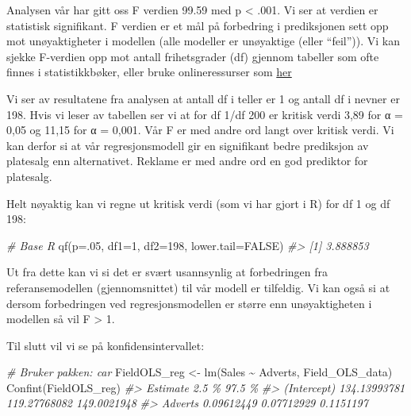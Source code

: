 \documentclass[
]{article}
\newenvironment{Shaded}{\begin{snugshade}}{\end{snugshade}}
\newcommand{\AttributeTok}[1]{\textcolor[rgb]{0.77,0.63,0.00}{#1}}
\newcommand{\CommentTok}[1]{\textcolor[rgb]{0.56,0.35,0.01}{\textit{#1}}}
\newcommand{\ConstantTok}[1]{\textcolor[rgb]{0.00,0.00,0.00}{#1}}
\newcommand{\DecValTok}[1]{\textcolor[rgb]{0.00,0.00,0.81}{#1}}
\newcommand{\FunctionTok}[1]{\textcolor[rgb]{0.00,0.00,0.00}{#1}}
\newcommand{\NormalTok}[1]{#1}
\newcommand{\OtherTok}[1]{\textcolor[rgb]{0.56,0.35,0.01}{#1}}
\newcommand{\SpecialCharTok}[1]{\textcolor[rgb]{0.00,0.00,0.00}{#1}}
\begin{document}
Analysen vår har gitt oss F verdien 99.59 med p \textless{} .001. Vi ser at verdien er statistisk signifikant. F verdien er et mål på forbedring i prediksjonen sett opp mot unøyaktigheter i modellen (alle modeller er unøyaktige (eller ``feil'')).
Vi kan sjekke F-verdien opp mot antall frihetsgrader (df) gjennom tabeller som ofte finnes i statistikkbøker, eller bruke onlineressurser som \href{http://www.stat.purdue.edu/~jtroisi/STAT350Spring2015/tables/FTable.pdf}{her}

Vi ser av resultatene fra analysen at antall df i teller er 1 og antall df i nevner er 198. Hvis vi leser av tabellen ser vi at for df 1/df 200 er kritisk verdi 3,89 for α = 0,05 og 11,15 for α = 0,001. Vår F er med andre ord langt over kritisk verdi. Vi kan derfor si at vår regresjonsmodell gir en signifikant bedre prediksjon av platesalg enn alternativet. Reklame er med andre ord en god prediktor for platesalg.

Helt nøyaktig kan vi regne ut kritisk verdi (som vi har gjort i R) for df 1 og df 198:

\begin{Shaded}
\begin{Highlighting}[]
\CommentTok{\# Base R}
\FunctionTok{qf}\NormalTok{(}\AttributeTok{p=}\NormalTok{.}\DecValTok{05}\NormalTok{, }\AttributeTok{df1=}\DecValTok{1}\NormalTok{, }\AttributeTok{df2=}\DecValTok{198}\NormalTok{, }\AttributeTok{lower.tail=}\ConstantTok{FALSE}\NormalTok{)}
\CommentTok{\#\textgreater{} [1] 3.888853}
\end{Highlighting}
\end{Shaded}

Ut fra dette kan vi si det er svært usannsynlig at forbedringen fra referansemodellen (gjennomsnittet) til vår modell er tilfeldig. Vi kan også si at dersom forbedringen ved regresjonsmodellen er større enn unøyaktigheten i modellen så vil F \textgreater{} 1.

Til slutt vil vi se på konfidensintervallet:

\begin{Shaded}
\begin{Highlighting}[]
\CommentTok{\# Bruker pakken: car}
\NormalTok{FieldOLS\_reg }\OtherTok{\textless{}{-}} \FunctionTok{lm}\NormalTok{(Sales }\SpecialCharTok{\textasciitilde{}}\NormalTok{ Adverts, Field\_OLS\_data)}
\FunctionTok{Confint}\NormalTok{(FieldOLS\_reg)}
\CommentTok{\#\textgreater{}                 Estimate        2.5 \%      97.5 \%}
\CommentTok{\#\textgreater{} (Intercept) 134.13993781 119.27768082 149.0021948}
\CommentTok{\#\textgreater{} Adverts       0.09612449   0.07712929   0.1151197}
\end{Highlighting}
\end{Shaded}
\end{document}

